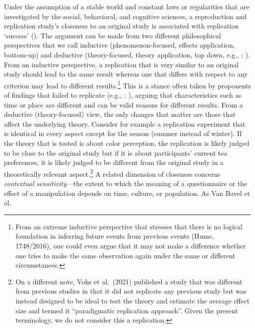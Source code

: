 \documentclass[
  letterpaper,
  DIV=11,
  openany,
  fontsize=12pt,
  parskip=half,
  headings=big,
  numbers=noenddot,
  titlepage=false]{scrreprt}
\begin{document}
Under the assumption of a stable world and constant laws or regularities
that are investigated by the social, behavioral, and cognitive sciences,
a reproduction and replication study's closeness to an original study is
associated with replication `success'
().
The argument can be made from two different philosophical perspectives
that we call inductive (phenomenon-focused, effects application,
bottom-up) and deductive (theory-focused, theory application, top down,
e.g., ;
). From an
inductive perspective, a replication that is very similar to an original
study should lead to the same result whereas one that differs with
respect to any criterion may lead to different results.\footnote{From an
  extreme inductive perspective that stresses that there is no logical
  foundation in inferring future events from previous events (Hume,
  1748/2016), one could even argue that it may not make a difference
  whether one tries to make the same observation again under the same or
  different circumstances.} This is a stance often taken by proponents
of findings that failed to replicate (e.g.,
;
), arguing that characteristics such
as time or place are different and can be valid reasons for different
results. From a deductive (theory-focused) view, the only changes that
matter are those that affect the underlying theory. Consider for example
a replication experiment that is identical in every aspect except for
the season (summer instead of winter). If the theory that is tested is
about color perception, the replication is likely judged to be close to
the original study but if it is about participants' current tea
preferences, it is likely judged to be different from the original study
in a theoretically relevant aspect.\footnote{On a different note, Vohs
  et al.~(2021) published a study that was different from previous
  studies in that it did not replicate any previous study but was
  instead designed to be ideal to test the theory and estimate the
  average effect size and termed it ``paradigmatic replication
  approach''. Given the present terminology, we do not consider this a
  replication.} A related dimension of closeness concerns
\emph{contextual sensitivity}---the extent to which the meaning of a
questionnaire or the effect of a manipulation depends on time, culture,
or population. As Van Bavel et al.
\end{document}
